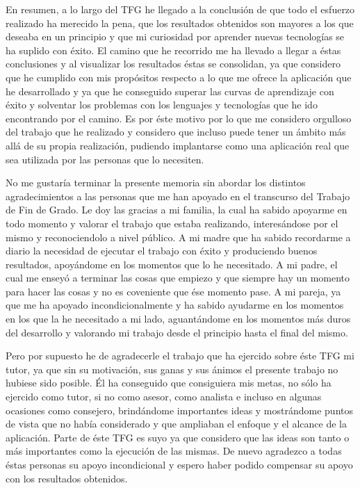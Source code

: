 \documentclass[11pt,openany]{book}
\begin{document}
En resumen, a lo largo del TFG he llegado a la conclusión de que todo el esfuerzo realizado ha merecido la pena, que los resultados obtenidos son mayores a los que deseaba en un principio y que mi curiosidad por aprender nuevas tecnologías se ha suplido con éxito. El camino que he recorrido me ha llevado a llegar a éstas conclusiones y al visualizar los resultados éstas se consolidan, ya que considero que he cumplido con mis propósitos respecto a lo que me ofrece la aplicación que he desarrollado y ya que he conseguido superar las curvas de aprendizaje con éxito y solventar los problemas con los lenguajes y tecnologías que he ido encontrando por el camino. Es por éste motivo por lo que me considero orgulloso del trabajo que he realizado y considero que incluso puede tener un ámbito más allá de su propia realización, pudiendo implantarse como una aplicación real que sea utilizada por las personas que lo necesiten.

No me gustaría terminar la presente memoria sin abordar los distintos agradecimientos a las personas que me han apoyado en el transcurso del Trabajo de Fin de Grado. Le doy las gracias a mi familia, la cual ha sabido apoyarme en todo momento y valorar el trabajo que estaba realizando, interesándose por el mismo y reconociendolo a nivel público. A mi madre que ha sabido recordarme a diario la necesidad de ejecutar el trabajo con éxito y produciendo buenos resultados, apoyándome en los momentos que lo he necesitado. A mi padre, el cual me enseyó a terminar las cosas que empiezo y que siempre hay un momento para hacer las cosas y no es coveniente que ése momento pase. A mi pareja, ya que me ha apoyado incondicionalmente y ha sabido ayudarme en los momentos en los que la he necesitado a mi lado, aguantándome en los momentos más duros del desarrollo y valorando mi trabajo desde el principio hasta el final del mismo. 

Pero por supuesto he de agradecerle el trabajo que ha ejercido sobre éste TFG mi tutor, ya que sin su motivación, sus ganas y sus ánimos el presente trabajo no hubiese sido posible. Él ha conseguido que consiguiera mis metas, no sólo ha ejercido como tutor, si no como asesor, como analista e incluso en algunas ocasiones como consejero, brindándome importantes ideas y mostrándome puntos de vista que no había considerado y que ampliaban el enfoque y el alcance de la aplicación. Parte de éste TFG es suyo ya que considero que las ideas son tanto o más importantes como la ejecución de las mismas. De nuevo agradezco a todas éstas personas su apoyo incondicional y espero haber podido compensar su apoyo con los resultados obtenidos. 
\end{document}

